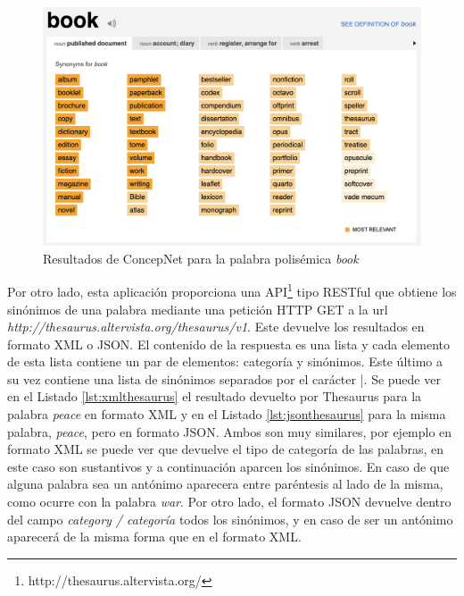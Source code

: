 	\begin{figure}[!h]
	\includegraphics[width=.9\textwidth]{Imagenes/Bitmap/Capitulo2/thesaurus_polisemica.png}
	\caption{Resultados de ConcepNet para la palabra polisémica \textit{book}}
	\label{fig:thesauruspolisemica}
	\end{figure}

Por otro lado, esta aplicación proporciona una API\footnote{http://thesaurus.altervista.org/} tipo RESTful que obtiene los sinónimos de una palabra mediante una petición HTTP GET a la url \textit{http://thesaurus.altervista.org/thesaurus/v1}. 
Este devuelve los resultados en formato XML o JSON. El contenido de la respuesta es una lista y cada elemento de esta lista contiene un par de elementos: categoría y sinónimos. Este último a su vez contiene una lista de sinónimos separados por el carácter |. 
Se puede ver en el Listado \ref{lst:xmlthesaurus} el resultado devuelto por Thesaurus para la palabra \textit{peace} en formato XML y en el Listado \ref{lst:jsonthesaurus} para la misma palabra, \textit{peace}, pero en formato JSON.
Ambos son muy similares, por ejemplo en formato XML se puede ver que devuelve el tipo de categoría de las palabras, en este caso son sustantivos y a continuación aparcen los sinónimos. En caso de que alguna palabra sea un antónimo aparecera entre paréntesis al lado de la misma, como ocurre con la palabra \textit{war}. Por otro lado, el formato JSON devuelve dentro del campo \textit{category / categoría} todos los sinónimos, y en caso de ser un antónimo aparecerá de la misma forma que en el formato XML.





